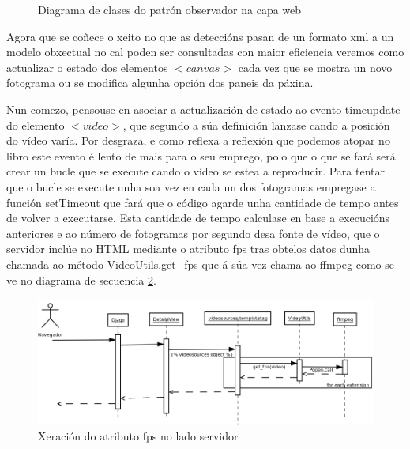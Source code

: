 \begin{figure}[htp]
\begin{center}
        \caption{Diagrama de clases do patrón observador na capa web}
    \label{fig:CapaWebJS}
    \end{center}
    \end{figure}
    
    Agora que se coñece o xeito no que as deteccións pasan de un formato xml a un modelo obxectual 
    no cal poden ser consultadas con maior eficiencia veremos como actualizar o estado dos elementos
    $<canvas>$ cada vez que se mostra un novo fotograma ou se modifica algunha opción dos paneis da
    páxina.
    
    Nun comezo, pensouse en asociar a actualización de estado ao evento timeupdate do elemento 
    $<video>$, que segundo a súa definición lanzase cando a posición do vídeo varía. Por desgraza, 
    e como reflexa a reflexión que podemos atopar no libro \cite[Capítulo 6.1]{video-con-html5}
    este evento é lento de mais para o seu emprego, polo que o que se fará será
    crear un bucle que se execute cando o vídeo se estea a reproducir. Para tentar que o bucle se 
    execute unha soa vez en cada un dos fotogramas empregase a función setTimeout que fará que o 
    código agarde unha cantidade de tempo antes de volver a executarse. Esta cantidade de tempo 
    calculase en base a execucións anteriores e ao número de fotogramas por segundo desa fonte de 
    vídeo, que o servidor inclúe no HTML mediante o atributo fps tras obtelos datos dunha chamada ao
    método VideoUtils.get\_fps que á súa vez chama ao ffmpeg como se ve no diagrama de secuencia 
    \ref{fig:GenerateFpsDjango}.
    
    \begin{figure}[htp]
    \begin{center}
        \includegraphics[scale=0.2]{figures/GenerateFpsDjango.png}
        \caption{Xeración do atributo fps no lado servidor}
    \label{fig:GenerateFpsDjango}
    \end{center}
    \end{figure}
    
